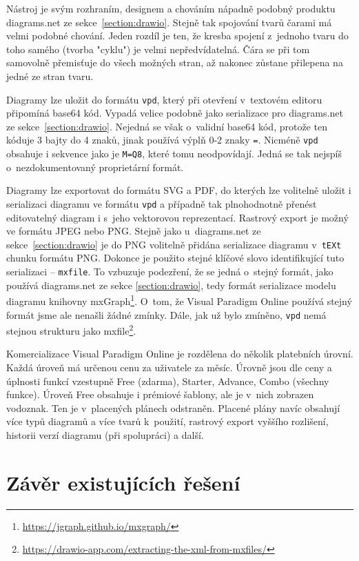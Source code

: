 Nástroj je svým rozhraním, designem a chováním nápadně podobný produktu diagrams.net ze sekce~\ref{section:drawio}.
Stejně tak spojování tvarů čarami má velmi podobné chování.
Jeden rozdíl je ten, že kresba spojení z~jednoho tvaru do toho samého (tvorba "cyklu") je velmi nepředvídatelná.
Čára se při tom samovolně přemisťuje do všech možných stran, až nakonec zůstane přilepena na jedné ze stran tvaru.

Diagramy lze uložit do formátu \texttt{vpd}, který při otevření v~textovém editoru připomíná base64 kód.
Vypadá velice podobně jako serializace pro diagrams.net ze sekce~\ref{section:drawio}.
Nejedná se však o~validní base64 kód, protože ten kóduje 3 bajty do 4 znaků, jinak používá výplň 0-2 znaky \texttt{=}.
Nicméně \texttt{vpd} obsahuje i sekvence jako je \texttt{M=Q8}, které tomu neodpovídají.
Jedná se tak nejspíš o~nezdokumentovaný proprietární formát.

Diagramy lze exportovat do formátu SVG a PDF, do kterých lze volitelně uložit i serializaci diagramu ve formátu \texttt{vpd} a případně tak plnohodnotně přenést editovatelný diagram i s~jeho vektorovou reprezentací.
Rastrový export je možný ve formátu JPEG nebo PNG.
Stejně jako u~diagrams.net ze sekce~\ref{section:drawio} je do PNG volitelně přidána serializace diagramu v~\texttt{tEXt} chunku formátu PNG.
Dokonce je použito stejné klíčové slovo identifikující tuto serializaci -- \texttt{mxfile}.
To vzbuzuje podezření, že se jedná o~stejný formát, jako používá diagrams.net ze sekce \ref{section:drawio}, tedy formát serializace modelu diagramu knihovny mxGraph\footnote{\url{https://jgraph.github.io/mxgraph/}}.
O~tom, že Visual Paradigm Online používá stejný formát jsme ale nenašli žádné zmínky.
Dále, jak už bylo zmíněno, \texttt{vpd} nemá stejnou strukturu jako mxfile\footnote{\url{https://drawio-app.com/extracting-the-xml-from-mxfiles/}}.

Komercializace Visual Paradigm Online je rozdělena do několik platebních úrovní.
Každá úroveň má určenou cenu za uživatele za měsíc.
Úrovně jsou dle ceny a úplnosti funkcí vzestupně Free (zdarma), Starter, Advance, Combo (všechny funkce).
Úroveň Free obsahuje i prémiové šablony, ale je v~nich zobrazen vodoznak.
Ten je v~placených plánech odstraněn.
Placené plány navíc obsahují více typů diagramů a více tvarů k~použití, rastrový export vyššího rozlišení, historii verzí diagramu (při spolupráci) a další.

\section{Závěr existujících řešení}

